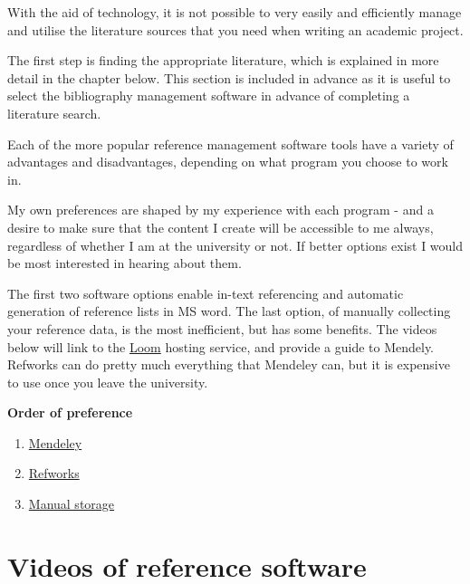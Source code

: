 \documentclass[
]{book}
\begin{document}
With the aid of technology, it is not possible to very easily and efficiently manage and utilise the literature sources that you need when writing an academic project.

The first step is finding the appropriate literature, which is explained in more detail in the chapter below. This section is included in advance as it is useful to select the bibliography management software in advance of completing a literature search.

Each of the more popular reference management software tools have a variety of advantages and disadvantages, depending on what program you choose to work in.

My own preferences are shaped by my experience with each program - and a desire to make sure that the content I create will be accessible to me always, regardless of whether I am at the university or not. If better options exist I would be most interested in hearing about them.

The first two software options enable in-text referencing and automatic generation of reference lists in MS word. The last option, of manually collecting your reference data, is the most inefficient, but has some benefits. The videos below will link to the \href{https://www.loom.com}{Loom} hosting service, and provide a guide to Mendely. Refworks can do pretty much everything that Mendeley can, but it is expensive to use once you leave the university.

\textbf{\textbf{Order of preference}}

\begin{enumerate}
\def\labelenumi{\arabic{enumi}.}
\item
  \href{https://www.mendeley.com/download-desktop-new/}{Mendeley}
\item
  \href{https://www.aub.aau.dk/software-web/refworks/}{Refworks}
\item
  \href{https://youtu.be/JwXQb25cpqA}{Manual storage}
\end{enumerate}

\hypertarget{videos-of-reference-software}{%
\section{Videos of reference software}\label{videos-of-reference-software}}
\end{document}
